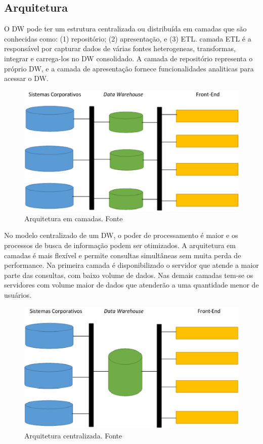 \subsection{Arquitetura}
O DW pode ter um estrutura centralizada ou distribuída em camadas que são conhecidas como: (1) repositório; (2) apresentação, e (3) ETL. camada ETL é a responsável por capturar dados de várias fontes heterogeneas, transformas, integrar e carrega-los no DW consolidado. A camada de repositório representa o próprio DW, e a camada de apresentação fornece funcionalidades analiticas para acessar o DW.

\begin{figure}[!htb]
	\centering
		\includegraphics[scale=0.7]{figuras/arqemcamadas.eps}
		\caption{Arquitetura em camadas. Fonte \cite{kimball}}
		\label{arqemcamadas}
\end{figure}

No modelo centralizado de um DW, o poder de processamento é maior e os processos de busca de informação podem ser otimizados. A arquitetura em camadas é mais flexível e permite consultas simultâneas sem muita perda de performance. Na primeira camada é disponibilizado o servidor que atende a maior parte das consultas, com baixo volume de dados. Nas demais camadas tem-se os servidores com volume maior de dados que atenderão a uma quantidade menor de usuários. \cite{kimball}

\begin{figure}[!htb]
	\centering
		\includegraphics[scale=0.7]{figuras/arqcentralizada.eps}
		\caption{Arquitetura centralizada. Fonte \cite{redbooks}}
		\label{arqcentralizada}
\end{figure}

